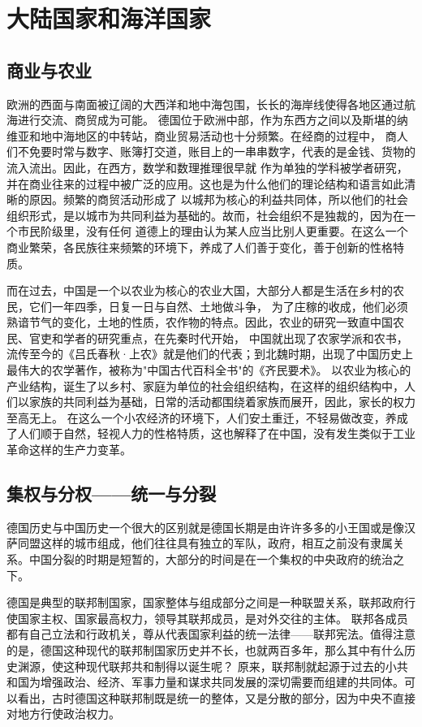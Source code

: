 \section{大陆国家和海洋国家}


\subsection{商业与农业}

欧洲的西面与南面被辽阔的大西洋和地中海包围，长长的海岸线使得各地区通过航海进行交流、商贸成为可能。
德国位于欧洲中部，作为东西方之间以及斯堪的纳维亚和地中海地区的中转站，商业贸易活动也十分频繁。在经商的过程中，
商人们不免要时常与数字、账簿打交道，账目上的一串串数字，代表的是金钱、货物的流入流出。因此，在西方，数学和数理推理很早就
作为单独的学科被学者研究，并在商业往来的过程中被广泛的应用。这也是为什么他们的理论结构和语言如此清晰的原因。频繁的商贸活动形成了
以城邦为核心的利益共同体，所以他们的社会组织形式，是以城市为共同利益为基础的。故而，社会组织不是独裁的，因为在一个市民阶级里，没有任何
道德上的理由认为某人应当比别人更重要。在这么一个商业繁荣，各民族往来频繁的环境下，养成了人们善于变化，善于创新的性格特质。

而在过去，中国是一个以农业为核心的农业大国，大部分人都是生活在乡村的农民，它们一年四季，日复一日与自然、土地做斗争，
为了庄稼的收成，他们必须熟谙节气的变化，土地的性质，农作物的特点。因此，农业的研究一致直中国农民、官吏和学者的研究重点，在先秦时代开始，
中国就出现了农家学派和农书，流传至今的《吕氏春秋·上农》就是他们的代表；到北魏时期，出现了中国历史上最伟大的农学著作，被称为"中国古代百科全书"的《齐民要术》。
以农业为核心的产业结构，诞生了以乡村、家庭为单位的社会组织结构，在这样的组织结构中，人们以家族的共同利益为基础，日常的活动都围绕着家族而展开，因此，家长的权力至高无上。
在这么一个小农经济的环境下，人们安土重迁，不轻易做改变，养成了人们顺于自然，轻视人力的性格特质，这也解释了在中国，没有发生类似于工业革命这样的生产力变革。




\subsection{集权与分权——统一与分裂}

德国历史与中国历史一个很大的区别就是德国长期是由许许多多的小王国或是像汉萨同盟这样的城市组成，他们往往具有独立的军队，政府，相互之前没有隶属关系。中国分裂的时期是短暂的，大部分的时间是在一个集权的中央政府的统治之下。

德国是典型的联邦制国家，国家整体与组成部分之间是一种联盟关系，联邦政府行使国家主权、国家最高权力，领导其联邦成员，是对外交往的主体。
联邦各成员都有自己立法和行政机关，尊从代表国家利益的统一法律——联邦宪法。值得注意的是，德国这种现代的联邦制国家历史并不长，也就两百多年，那么其中有什么历史渊源，使这种现代联邦共和制得以诞生呢？
原来，联邦制就起源于过去的小共和国为增强政治、经济、军事力量和谋求共同发展的深切需要而组建的共同体。可以看出，古时德国这种联邦制既是统一的整体，又是分散的部分，因为中央不直接对地方行使政治权力。

